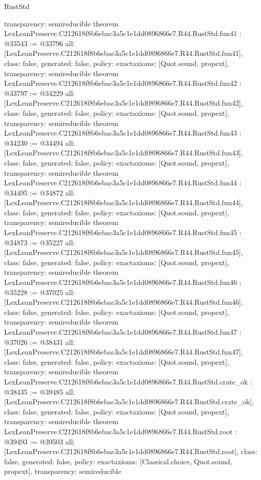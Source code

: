 \begin{lexlean}{RustStd}
\begin{coremodule}
{  transparency: semireducible
}
theorem LexLeanPreserve.C212618f8b6ebac3a5c1e1dd0896866e7.R44.RustStd.fun41 : @33543 := @33796 {
  all: [LexLeanPreserve.C212618f8b6ebac3a5c1e1dd0896866e7.R44.RustStd.fun41],
  class: false,
  generated: false,
  policy: exact{axioms: [Quot.sound, propext]},
  transparency: semireducible
}
theorem LexLeanPreserve.C212618f8b6ebac3a5c1e1dd0896866e7.R44.RustStd.fun42 : @33797 := @34229 {
  all: [LexLeanPreserve.C212618f8b6ebac3a5c1e1dd0896866e7.R44.RustStd.fun42],
  class: false,
  generated: false,
  policy: exact{axioms: [Quot.sound, propext]},
  transparency: semireducible
}
theorem LexLeanPreserve.C212618f8b6ebac3a5c1e1dd0896866e7.R44.RustStd.fun43 : @34230 := @34494 {
  all: [LexLeanPreserve.C212618f8b6ebac3a5c1e1dd0896866e7.R44.RustStd.fun43],
  class: false,
  generated: false,
  policy: exact{axioms: [Quot.sound, propext]},
  transparency: semireducible
}
theorem LexLeanPreserve.C212618f8b6ebac3a5c1e1dd0896866e7.R44.RustStd.fun44 : @34495 := @34872 {
  all: [LexLeanPreserve.C212618f8b6ebac3a5c1e1dd0896866e7.R44.RustStd.fun44],
  class: false,
  generated: false,
  policy: exact{axioms: [Quot.sound, propext]},
  transparency: semireducible
}
theorem LexLeanPreserve.C212618f8b6ebac3a5c1e1dd0896866e7.R44.RustStd.fun45 : @34873 := @35227 {
  all: [LexLeanPreserve.C212618f8b6ebac3a5c1e1dd0896866e7.R44.RustStd.fun45],
  class: false,
  generated: false,
  policy: exact{axioms: [Quot.sound, propext]},
  transparency: semireducible
}
theorem LexLeanPreserve.C212618f8b6ebac3a5c1e1dd0896866e7.R44.RustStd.fun46 : @35228 := @37025 {
  all: [LexLeanPreserve.C212618f8b6ebac3a5c1e1dd0896866e7.R44.RustStd.fun46],
  class: false,
  generated: false,
  policy: exact{axioms: [Quot.sound, propext]},
  transparency: semireducible
}
theorem LexLeanPreserve.C212618f8b6ebac3a5c1e1dd0896866e7.R44.RustStd.fun47 : @37026 := @38431 {
  all: [LexLeanPreserve.C212618f8b6ebac3a5c1e1dd0896866e7.R44.RustStd.fun47],
  class: false,
  generated: false,
  policy: exact{axioms: [Quot.sound, propext]},
  transparency: semireducible
}
theorem LexLeanPreserve.C212618f8b6ebac3a5c1e1dd0896866e7.R44.RustStd.crate_ok : @38435 := @39485 {
  all: [LexLeanPreserve.C212618f8b6ebac3a5c1e1dd0896866e7.R44.RustStd.crate_ok],
  class: false,
  generated: false,
  policy: exact{axioms: [Quot.sound, propext]},
  transparency: semireducible
}
theorem LexLeanPreserve.C212618f8b6ebac3a5c1e1dd0896866e7.R44.RustStd.root : @39493 := @39503 {
  all: [LexLeanPreserve.C212618f8b6ebac3a5c1e1dd0896866e7.R44.RustStd.root],
  class: false,
  generated: false,
  policy: exact{axioms: [Classical.choice, Quot.sound, propext]},
  transparency: semireducible
}


\end{coremodule}
\end{lexlean}
